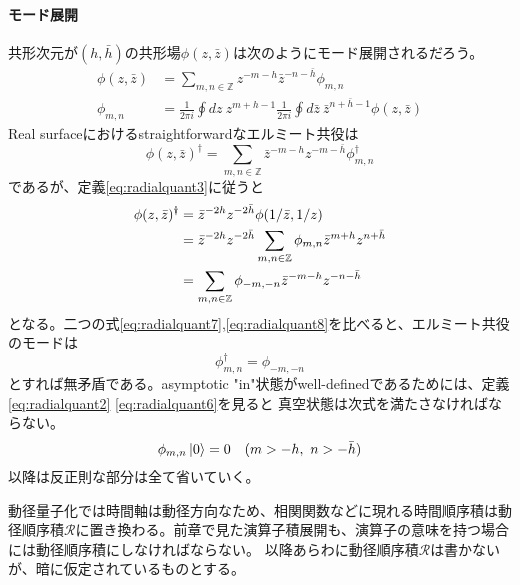 \documentclass[11pt, aps, longbibliography]{article}
\numberwithin{equation}{section}
\begin{document}
    \paragraph{モード展開}
        共形次元が$(h,\bar{h})$の共形場$\phi(z,\bar{z})$は次のようにモード展開されるだろう。
        \begin{align}\label{eq:radialquant6}
            \phi(z, \bar{z}) &= \sum_{m,n\in \mathbb{Z}}z^{-m-h}\bar{z}^{-n-\bar{h}}\phi_{m,n} \\
            \phi_{m,n} &= \frac{1}{2\pi i}\oint dz \ z^{m+h-1} \frac{1}{2\pi i}\oint d\bar{z} \ \bar{z}^{n+\bar{h}-1} \phi(z, \bar{z})
        \end{align}
        Real surfaceにおけるstraightforwardなエルミート共役は
        \begin{equation}\label{eq:radialquant7}
            \phi(z, \bar{z})^\dagger = \sum_{m,n\in \mathbb{Z}}\bar{z}^{-m-h}z^{-m-\bar{h}}\phi_{m,n}^\dagger
        \end{equation}
        であるが、定義\eqref{eq:radialquant3}に従うと
        \begin{align}\label{eq:radialquant8}
            \phi(z, \bar{z})^\dagger &= \bar{z}^{-2h}z^{-2\bar{h}}\phi(1/\bar{z}, 1/z) \notag \\
            &= \bar{z}^{-2h}z^{-2\bar{h}} \sum_{m,n\in \mathbb{Z}} \phi_{m,n} \bar{z}^{m+h}z^{n+\bar{h}} \notag \\
            &= \sum_{m,n \in \mathbb{Z}} \phi_{-m,-n}\bar{z}^{-m-h}z^{-n-\bar{h}}
        \end{align}
        となる。二つの式\eqref{eq:radialquant7},\eqref{eq:radialquant8}を比べると、エルミート共役のモードは
        \begin{equation}\label{eq:radialquant9}
            \phi_{m,n}^\dagger= \phi_{-m,-n}
        \end{equation}
        とすれば無矛盾である。asymptotic "in"状態がwell-definedであるためには、定義\eqref{eq:radialquant2} \eqref{eq:radialquant6}を見ると
        真空状態は次式を満たさなければならない。
        \begin{equation}\label{eq:radialquant10}
            \phi_{m,n}\ket{0} = 0 \quad (m>-h, \ n>-\bar{h})
        \end{equation}
        以降は反正則な部分は全て省いていく。

        動径量子化では時間軸は動径方向なため、相関関数などに現れる時間順序積は動径順序積$\mathcal{R}$に置き換わる。前章で見た演算子積展開も、演算子の意味を持つ場合には動径順序積にしなければならない。
        以降あらわに動径順序積$\mathcal{R}$は書かないが、暗に仮定されているものとする。
\end{document}
